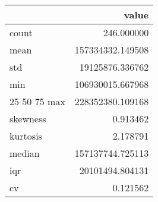 \begin{tabular}{lr}
\toprule
 & value \\
\midrule
count & 246.000000 \\
mean & 157334332.149508 \\
std & 19125876.336762 \\
min & 106930015.667968 \\
25%
50%
75%
max & 228352380.109168 \\
skewness & 0.913462 \\
kurtosis & 2.178791 \\
median & 157137744.725113 \\
iqr & 20101494.804131 \\
cv & 0.121562 \\
\bottomrule
\end{tabular}
